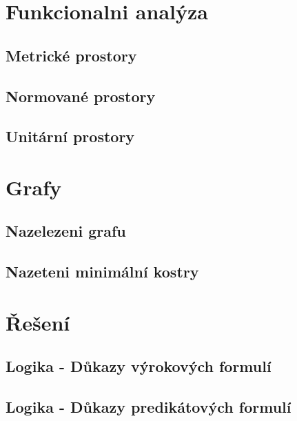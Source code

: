\documentclass[12pt,a4paper,notitlepage,final]{article}
\begin{document}
\section{Funkcionalni analýza}
\subsection{Metrické prostory}               	
\subsection{Normované prostory}              	
\subsection{Unitární prostory}               	

\section{Grafy}
\subsection{Nazelezeni grafu}                	
\subsection{Nazeteni minimální kostry} 				

\section{Řešení}

\subsection{Logika - Důkazy výrokových formulí}
\setcounter{section}{2}
\setcounter{subsection}{1}

\setcounter{section}{6}
\setcounter{subsection}{1}
\subsection{Logika - Důkazy predikátových formulí}   
\setcounter{section}{2}
\setcounter{subsection}{2}

\setcounter{section}{6}
\setcounter{subsection}{2}
\end{document}
